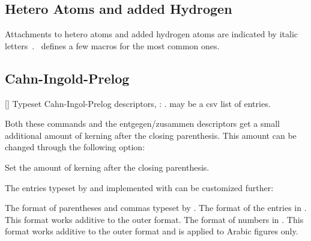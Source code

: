 \documentclass{chemmacros-manual}
\begin{document}
\begin{example}
   \par
\end{example}

\subsection{Hetero Atoms and added Hydrogen}

Attachments to hetero atoms and added hydrogen atoms are indicated by italic
letters~\cite{iupac:greenbook}.  \chemmacros\ defines a few macros for the
most common ones.
\begin{commands}
\end{commands}
\begin{example}
  
  
\end{example}

\subsection{Cahn-Ingold-Prelog}\label{par:cip}
\begin{commands}
  []
    Typeset Cahn-Ingol-Prelog descriptors, \eg: 
    .  may be a csv list of entries.
\end{commands}

Both these commands and the entgegen/zusammen descriptors get a small
additional amount of kerning after the closing parenthesis.  This amount can
be changed through the following option:
\begin{options}
  \Initial{.075em}
    Set the amount of kerning after the closing parenthesis.
\end{options}
The entries typeset by and implemented with  can be customized
further:
\begin{options}
    The format of parentheses and commas typeset by
    .
    The format of the entries in .  This format
    works additive to the outer format.
    The format of numbers in .  This format works
    additive to the outer format and is applied to Arabic figures only.
\end{options}
\end{document}
